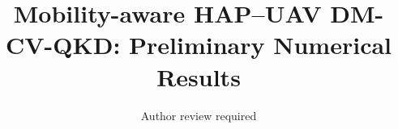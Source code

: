 \documentclass[journal]{IEEEtran}
\begin{document}
\title{Mobility-aware HAP--UAV DM-CV-QKD: Preliminary Numerical Results}
\author{Author review required}
\maketitle

\end{document}
